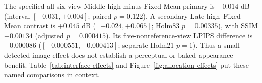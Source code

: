 \documentclass[times,twocolumn,final]{elsarticle}
\providecommand{\DIFadd}[1]{{\protect\color{blue} \sf #1}} %
\providecommand{\DIFaddbegin}{} %
\providecommand{\DIFaddend}{} %
\providecommand{\DIFdelbegin}{} %
\providecommand{\DIFdelend}{} %
\begin{document}
\DIFdelbegin %
\DIFdelend \DIFaddbegin \DIFadd{The specified all-six-view Middle-high minus Fixed Mean primary is $-0.014$ dB (interval $[-0.031,+0.004]$; paired $p=0.122$). A secondary Late-high--Fixed Mean contrast is $+0.045$ dB ($[+0.024,+0.065]$; Holm83 $p=0.00335$), with SSIM $+0.00134$ (adjusted $p=0.000415$). Its five-nonreference-view LPIPS difference is $-0.000086$ ($[-0.000551,+0.000413]$; separate Holm21 $p=1$). Thus a small detected image effect does not establish a perceptual or baked-appearance benefit. Table~\ref{tab:interface-effects} and Figure~\ref{fig:allocation-effects} put these named comparisons in context.
}\DIFaddend 
\end{document}
